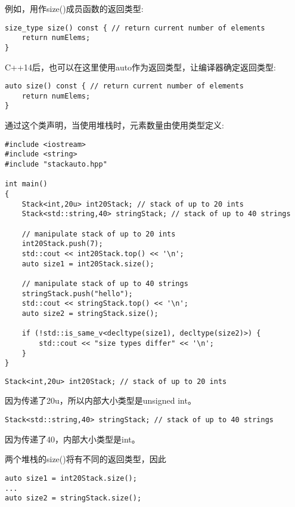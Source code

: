 例如，用作size()成员函数的返回类型:

\begin{lstlisting}[style=styleCXX]
size_type size() const { // return current number of elements
	return numElems;
}
\end{lstlisting}

C++14后，也可以在这里使用auto作为返回类型，让编译器确定返回类型:

\begin{lstlisting}[style=styleCXX]
auto size() const { // return current number of elements
	return numElems;
}
\end{lstlisting}

通过这个类声明，当使用堆栈时，元素数量由使用类型定义:

\begin{lstlisting}[style=styleCXX]
#include <iostream>
#include <string>
#include "stackauto.hpp"

int main()
{
	Stack<int,20u> int20Stack; // stack of up to 20 ints
	Stack<std::string,40> stringStack; // stack of up to 40 strings
	
	// manipulate stack of up to 20 ints
	int20Stack.push(7);
	std::cout << int20Stack.top() << '\n';
	auto size1 = int20Stack.size();
	
	// manipulate stack of up to 40 strings
	stringStack.push("hello");
	std::cout << stringStack.top() << '\n';
	auto size2 = stringStack.size();
	
	if (!std::is_same_v<decltype(size1), decltype(size2)>) {
		std::cout << "size types differ" << '\n';
	}
}
\end{lstlisting}


\begin{lstlisting}[style=styleCXX]
Stack<int,20u> int20Stack; // stack of up to 20 ints
\end{lstlisting}

因为传递了20u，所以内部大小类型是unsigned int。

\begin{lstlisting}[style=styleCXX]
Stack<std::string,40> stringStack; // stack of up to 40 strings
\end{lstlisting}

因为传递了40，内部大小类型是int。

两个堆栈的size()将有不同的返回类型，因此

\begin{lstlisting}[style=styleCXX]
auto size1 = int20Stack.size();
...
auto size2 = stringStack.size();
\end{lstlisting}

